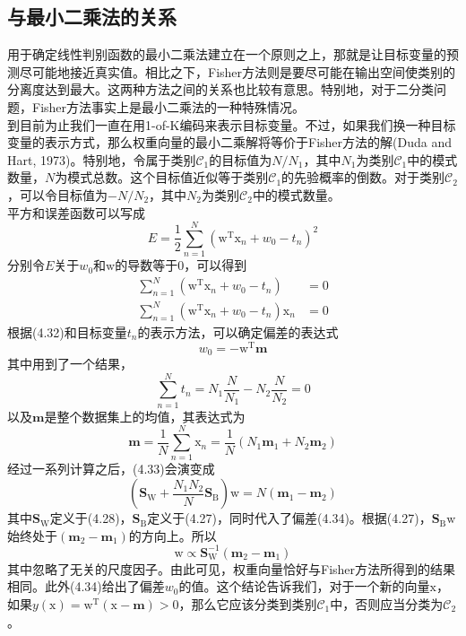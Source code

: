 \documentclass[b5paper]{book}
\numberwithin{equation}{chapter}
\newcommand {\bx} {\boldsymbol{\mathrm{x}}}
\newcommand {\bw} {\boldsymbol{\mathrm{w}}}
\newcommand {\rmT} {\mathrm{T}}
\begin{document}
	\subsection{与最小二乘法的关系}
	\textnormal{
	用于确定线性判别函数的最小二乘法建立在一个原则之上，那就是让目标变量的预测尽可能地接近真实值。相比之下，Fisher方法则是要尽可能在输出空间使类别的分离度达到最大。这两种方法之间的关系也比较有意思。特别地，对于二分类问题，Fisher方法事实上是最小二乘法的一种特殊情况。\\
	\indent 到目前为止我们一直在用1-of-K编码来表示目标变量。不过，如果我们换一种目标变量的表示方式，那么权重向量的最小二乘解将等价于Fisher方法的解(Duda and Hart, 1973)。特别地，令属于类别$\mathcal{C}_1$的目标值为$N/N_1$，其中$N_1$为类别$\mathcal{C}_1$中的模式数量，$N$为模式总数。这个目标值近似等于类别$\mathcal{C}_1$的先验概率的倒数。对于类别$\mathcal{C}_2$，可以令目标值为$-N/N_2$，其中$N_2$为类别$\mathcal{C}_2$中的模式数量。\\
	\indent 平方和误差函数可以写成
	\begin{equation}
		E = \frac{1}{2}\sum_{n=1}^N (\bw^{\rmT}\bx_n + w_0 -t_n)^2
	\end{equation}
	分别令$E$关于$w_0$和$\bw$的导数等于0，可以得到
	\begin{align}
		\sum_{n=1}^N(\bw^{\rmT}\bx_n + w_0 - t_n)&=0\\
		\sum_{n=1}^N(\bw^{\rmT}\bx_n + w_0 -t_n)\bx_n &= 0
	\end{align}
	根据(4.32)和目标变量$t_n$的表示方法，可以确定偏差的表达式
	\begin{equation}
		w_0 = -\bw^{\rmT}\mathbf{m}
	\end{equation}
	其中用到了一个结果，
	\begin{equation}
		\sum_{n=1}^N t_n =N_1\frac{N}{N_1} - N_2\frac{N}{N_2} = 0
	\end{equation}
	以及$\mathbf{m}$是整个数据集上的均值，其表达式为
	\begin{equation}
		\mathbf{m} = \frac{1}{N}\sum_{n=1}^N \bx_n = \frac{1}{N}(N_1 \mathbf{m}_1 + N_2\mathbf{m}_2)
	\end{equation}
	经过一系列计算之后，(4.33)会演变成
	\begin{equation}
		\left(\mathbf{S}_\mathrm{W} + \frac{N_1 N_2}{N}\mathbf{S}_\mathrm{B}\right)\bw = N(\mathbf{m}_1 - \mathbf{m}_2)
	\end{equation}
	其中$\mathbf{S}_\mathrm{W}$定义于(4.28)，$\mathbf{S}_\mathrm{B}$定义于(4.27)，同时代入了偏差(4.34)。根据(4.27)，$\mathbf{S}_\mathrm{B}\bw$始终处于$(\mathbf{m}_2 - \mathbf{m}_1)$的方向上。所以
	\begin{equation}
		\bw \propto \mathbf{S}_\mathrm{W}^{-1}(\mathbf{m}_2 - \mathbf{m}_1)
	\end{equation}
	其中忽略了无关的尺度因子。由此可见，权重向量恰好与Fisher方法所得到的结果相同。此外(4.34)给出了偏差$w_0$的值。这个结论告诉我们，对于一个新的向量$\bx$，如果$y(\bx) = \bw^{\rmT}(\bx - \mathbf{m})>0$，那么它应该分类到类别$\mathcal{C}_1$中，否则应当分类为$\mathcal{C}_2$。
	}
\end{document}
